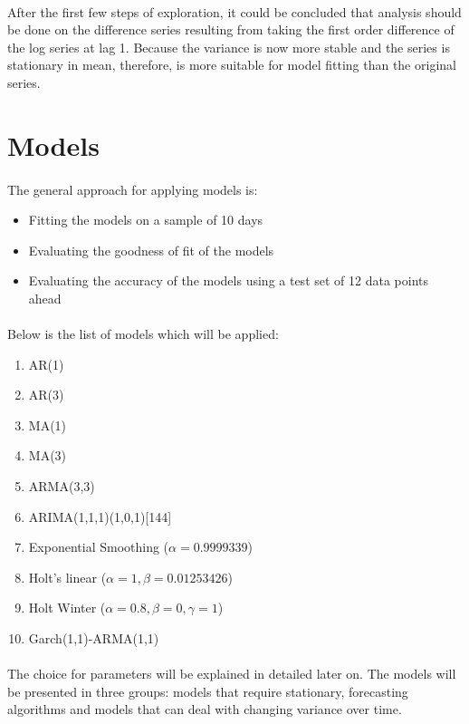 \documentclass[12pt]{article}
\begin{document}
\paragraph{}
After the first few steps of exploration, it could be concluded that analysis should be done on the difference series resulting from taking the first order difference of the log series at lag 1. Because the variance is now more stable and the  series is stationary in mean, therefore, is more suitable for model fitting than the original series.
 
\section{Models}
\paragraph{}
The general approach for applying models is: 
\begin{itemize}
  \item Fitting the models on a sample of 10 days 
  \item Evaluating the goodness of fit of the models
  \item Evaluating the accuracy of the models using a test set of 12 data points ahead
\end{itemize}
\paragraph{}
Below is the list of models which will be applied:
\begin{enumerate}
  \item AR(1)
  \item AR(3)
  \item MA(1)
  \item MA(3)
  \item ARMA(3,3)
  \item ARIMA(1,1,1)(1,0,1)[144]
  \item Exponential Smoothing ($\alpha=0.9999339$)
  \item Holt's linear ($\alpha=1,\beta=0.01253426$)
  \item Holt Winter ($\alpha=0.8,\beta=0,\gamma=1$)
  \item Garch(1,1)-ARMA(1,1)
\end{enumerate}

\paragraph{}
The choice for parameters will be explained in detailed later on. The models will be presented in three groups: models that require stationary, forecasting algorithms and models that can deal with changing variance over time.
\end{document}
